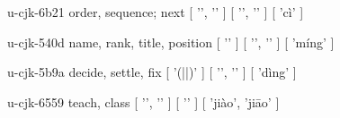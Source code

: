 \begin{multicols}{2}
\lettrine[lines=3]{\cjkgGlue{}}{}\begin{minipage}{0.8\linewidth} u-cjk-6b21  order, sequence; next  [ '\cjkgGlue{}', '\cjkgGlue{}' ]  [ '\cjkgGlue{}', '\cjkgGlue{}' ]  [ 'cì' ] \end{minipage}

\lettrine[lines=3]{\cjkgGlue{}}{}\begin{minipage}{0.8\linewidth} u-cjk-540d  name, rank, title, position  [ '\cjkgGlue{}' ]  [ '\cjkgGlue{}', '\cjkgGlue{}' ]  [ 'míng' ] \end{minipage}

\lettrine[lines=3]{\cjkgGlue{}}{}\begin{minipage}{0.8\linewidth} u-cjk-5b9a  decide, settle, fix  [ '\cjkgGlue{}(\cjkgGlue{}|\cjkgGlue{}|\cjkgGlue{})' ]  [ '\cjkgGlue{}', '\cjkgGlue{}' ]  [ 'dìng' ] \end{minipage}

\lettrine[lines=3]{\cjkgGlue{}}{}\begin{minipage}{0.8\linewidth} u-cjk-6559  teach, class  [ '\cjkgGlue{}', '\cjkgGlue{}' ]  [ '\cjkgGlue{}' ]  [ 'jiào', 'jiāo' ] \end{minipage}


\end{multicols}
